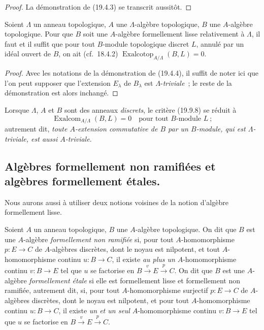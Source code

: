 \begin{proof}
La démonstration de (19.4.3) se transcrit aussitôt.
\end{proof}

\begin{proposition}[19.9.8]
\label{0.19.9.8-fr}
Soient $\Lambda$ un anneau topologique, $A$ une $\Lambda$-algèbre topologique,
$B$ une $A$-algèbre topologique. Pour que $B$ soit une $A$-algèbre
formellement lisse relativement à $\Lambda$, il faut et il suffit que pour tout
$B$-module topologique discret $L$, annulé par un idéal ouvert de $B$, on ait
\textup{(cf.~18.4.2)}
$\operatorname{Exalcotop}_{A/\Lambda}(B,L)=0$.
\end{proposition}

\begin{proof}
Avec les notations de la démonstration de (19.4.4), il suffit de noter ici que
l'on peut supposer que l'extension $E_\lambda$ de $B_\lambda$ est
$\Lambda$-\emph{triviale}~; le reste de la démonstration est alors inchangé.
\end{proof}

Lorsque $\Lambda$, $A$ et $B$ sont des anneaux \emph{discrets}, le critère (19.9.8) se
réduit à
\begin{equation}
\tag{19.9.8.1}
\label{0.19.9.8.1-fr}
  \operatorname{Exalcom}_{A/\Lambda}(B,L)=0
  \quad\text{pour tout $B$-module $L$}~;
\end{equation}
autrement dit, \emph{toute $A$-extension commutative de $B$ par un $B$-module,
qui est $\Lambda$-triviale, est aussi $A$-triviale}.

\subsection{Algèbres formellement non ramifiées et algèbres formellement
étales.}
\label{subsection:0.19.10-fr}
\label{0.19.10-fr}

\begin{env}[19.10.1]
\label{0.19.10.1-fr}
Nous aurons aussi à utiliser deux notions voisines de la notion d'algèbre
formellement lisse.
\end{env}

\begin{definition}[19.10.2]
\label{0.19.10.2-fr}
Soient $A$ un anneau topologique, $B$ une $A$-algèbre topologique. On dit que
$B$ est une $A$-algèbre \emph{formellement non ramifiée} si, pour tout
$A$-homomorphisme $p:E\to C$ de $A$-algèbres discrètes, dont le noyau est
nilpotent, et tout $A$-homomorphisme continu $u:B\to C$, il existe \emph{au plus
un} $A$-homomorphisme continu $v:B\to E$ tel que $u$ se factorise en
$B\xrightarrow{v}E\xrightarrow{p}C$. On dit que $B$ est une $A$-algèbre
\emph{formellement étale} si elle est formellement lisse et formellement non
ramifiée, autrement dit, si, pour tout $A$-homomorphisme surjectif $p:E\to C$
de $A$-algèbres discrètes, dont le noyau est nilpotent, et pour tout
$A$-homomorphisme continu $u:B\to C$, il existe \emph{un et un seul}
$A$-homomorphisme continu $v:B\to E$ tel que $u$ se factorise en
$B\xrightarrow{v}E\xrightarrow{p}C$.
\end{definition}

